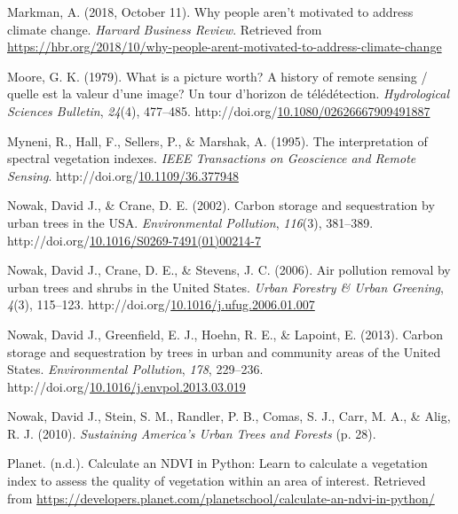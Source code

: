 \documentclass[12pt,twoside]{reedthesis}
\newlength{\cslhangindent}
\newenvironment{CSLReferences}[2] %
 {%
  \setlength{\parindent}{0pt}
  \ifodd #1 \everypar{\setlength{\hangindent}{\cslhangindent}}\ignorespaces\fi
  \ifnum #2 > 0
  \setlength{\parskip}{#2\baselineskip}
  \fi
 }%
 {}
\begin{document}
\begin{CSLReferences}{1}{0}
\leavevmode{}%
Markman, A. (2018, October 11). Why people aren{'}t motivated to address climate change. \emph{Harvard Business Review}. Retrieved from \url{https://hbr.org/2018/10/why-people-arent-motivated-to-address-climate-change}

\leavevmode{}%
Moore, G. K. (1979). What is a picture worth? A history of remote sensing / quelle est la valeur d'une image? Un tour d'horizon de télédétection. \emph{Hydrological Sciences Bulletin}, \emph{24}(4), 477--485. http://doi.org/\href{https://doi.org/10.1080/02626667909491887}{10.1080/02626667909491887}

\leavevmode{}%
Myneni, R., Hall, F., Sellers, P., \& Marshak, A. (1995). The interpretation of spectral vegetation indexes. \emph{IEEE Transactions on Geoscience and Remote Sensing}. http://doi.org/\href{https://doi.org/10.1109/36.377948}{10.1109/36.377948}

\leavevmode{}%
Nowak, David J., \& Crane, D. E. (2002). Carbon storage and sequestration by urban trees in the USA. \emph{Environmental Pollution}, \emph{116}(3), 381--389. http://doi.org/\href{https://doi.org/10.1016/S0269-7491(01)00214-7}{10.1016/S0269-7491(01)00214-7}

\leavevmode{}%
Nowak, David J., Crane, D. E., \& Stevens, J. C. (2006). Air pollution removal by urban trees and shrubs in the United States. \emph{Urban Forestry \& Urban Greening}, \emph{4}(3), 115--123. http://doi.org/\href{https://doi.org/10.1016/j.ufug.2006.01.007}{10.1016/j.ufug.2006.01.007}

\leavevmode{}%
Nowak, David J., Greenfield, E. J., Hoehn, R. E., \& Lapoint, E. (2013). Carbon storage and sequestration by trees in urban and community areas of the United States. \emph{Environmental Pollution}, \emph{178}, 229--236. http://doi.org/\href{https://doi.org/10.1016/j.envpol.2013.03.019}{10.1016/j.envpol.2013.03.019}

\leavevmode{}%
Nowak, David J., Stein, S. M., Randler, P. B., Comas, S. J., Carr, M. A., \& Alig, R. J. (2010). \emph{Sustaining America{'}s Urban Trees and Forests} (p. 28).

\leavevmode{}%
Planet. (n.d.). Calculate an NDVI in Python: Learn to calculate a vegetation index to assess the quality of vegetation within an area of interest. Retrieved from \url{https://developers.planet.com/planetschool/calculate-an-ndvi-in-python/}


\end{CSLReferences}
\end{document}
